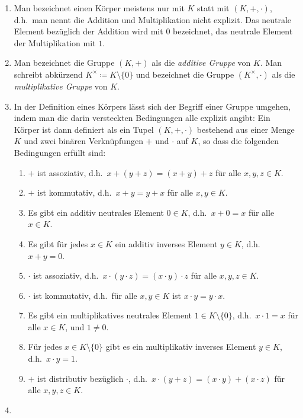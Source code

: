 \begin{bem}
 \begin{enumerate}[leftmargin=*]
  \item
   Man bezeichnet einen Körper meistens nur mit $K$ statt mit $(K,+,\cdot)$, d.h.\ man nennt die Addition und Multiplikation nicht explizit. Das neutrale Element bezüglich der Addition wird mit $0$ bezeichnet, das neutrale Element der Multiplikation mit $1$.
  \item
   Man bezeichnet die Gruppe $(K,+)$ als die \emph{additive Gruppe} von $K$. Man schreibt abkürzend $K^\times \coloneqq K\setminus\{0\}$ und bezeichnet die Gruppe $(K^\times,\cdot)$ als die \emph{multiplikative Gruppe} von $K$.
  \item
   In der Definition eines Körpers lässt sich der Begriff einer Gruppe umgehen, indem man die darin versteckten Bedingungen alle explizit angibt: Ein Körper ist dann definiert als ein Tupel $(K,+,\cdot)$ bestehend aus einer Menge $K$ und zwei binären Verknüpfungen $+$ und $\cdot$ auf $K$, so dass die folgenden Bedingungen erfüllt sind:
   \begin{enumerate}[label=\roman*)]
    \item
     $+$ ist assoziativ, d.h.\ $x+(y+z) = (x+y)+z$ für alle $x,y,z \in K$.
    \item
     $+$ ist kommutativ, d.h.\ $x+y = y+x$ für alle $x,y \in K$.
    \item
     Es gibt ein additiv neutrales Element $0 \in K$, d.h.\ $x + 0 = x$ für alle $x \in K$.
    \item
     Es gibt für jedes $x \in K$ ein additiv inverses Element $y \in K$, d.h.\ $x+y = 0$.
    \item
     $\cdot$ ist assoziativ, d.h.\ $x \cdot (y \cdot z) = (x \cdot y) \cdot z$ für alle $x,y,z \in K$.
    \item
     $\cdot$ ist kommutativ, d.h.\ für alle $x,y \in K$ ist $x \cdot y = y \cdot x$.
    \item
     Es gibt ein multiplikatives neutrales Element $1 \in K\setminus\{0\}$, d.h.\ $x \cdot 1 = x$ für alle $x \in K$, und $1 \neq 0$.
    \item
     Für jedes $x \in K\setminus\{0\}$ gibt es ein multiplikativ inverses Element $y \in K$, d.h.\ $x \cdot y = 1$.
    \item
     $+$ ist distributiv bezüglich $\cdot$, d.h.\ $x \cdot (y+z) = (x \cdot y) + (x \cdot z)$ für alle $x,y,z \in K$.
   \end{enumerate}
  \item

\end{enumerate}
\end{bem}
